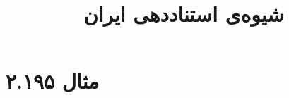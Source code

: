 \documentclass[a4paper,10pt]{article}
\begin{document}
\title{شیوه‌ی استناددهی ایران}
\author{}
\date{}
\maketitle



\section*{مثال ۲.۱۹۵}

\cite{آرمین1385}\\
\cite{سبزعلیان1385}\\
\begin{latin} \noindent
\cite{mitchel2001}\\
\cite{reuters2001}\\
\end{latin}






\end{document}
